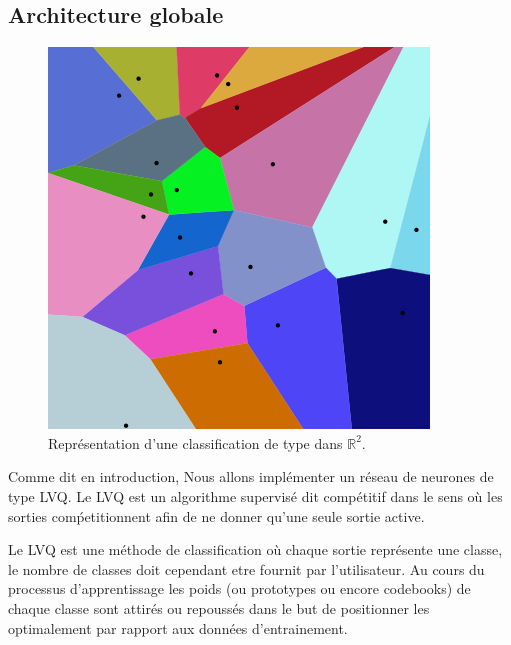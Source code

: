 \documentclass[11pt]{article}
\begin{document}
\subsection{Architecture globale}
\begin{figure}[htp]
	\centering
	\includegraphics[scale=.5]{img/tesselation.png}
	\caption{Repr\'esentation d'une classification de type dans $\mathbb{R}^2$.}
\end{figure}

Comme dit en introduction, Nous allons impl\'ementer un r\'eseau de neurones
de type LVQ. Le LVQ est un algorithme supervis\'e dit comp\'etitif dans le sens
o\`u les sorties com\'petitionnent afin de ne donner qu'une seule sortie active. 

Le LVQ est une m\'ethode de classification o\`u chaque sortie repr\'esente une
classe, le nombre de classes doit cependant etre fournit par l'utilisateur.
Au cours du processus d'apprentissage les poids (ou prototypes ou encore
codebooks) de chaque classe sont attir\'es ou repouss\'es
dans le but de positionner les optimalement par rapport aux donn\'ees d'entrainement.


\end{document}
